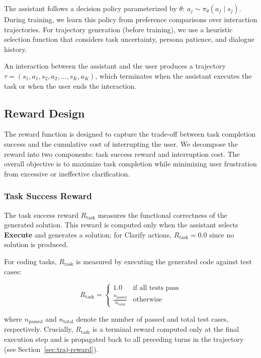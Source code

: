 The assistant follows a decision policy parameterized by $\theta$: $a_j \sim \pi_\theta(a_j \mid s_j)$. During training, we learn this policy from preference comparisons over interaction trajectories. For trajectory generation (before training), we use a heuristic selection function that considers task uncertainty, persona patience, and dialogue history.

An interaction between the assistant and the user produces a trajectory $\tau = (s_1, a_1, s_2, a_2, \dots, s_K, a_K)$, which terminates when the assistant executes the task or when the user ends the interaction.

\subsection{Reward Design}

The reward function is designed to capture the trade-off between task completion success and the cumulative cost of interrupting the user. We decompose the reward into two components: task success reward and interruption cost. The overall objective is to maximize task completion while minimizing user frustration from excessive or ineffective clarification.

\subsubsection{Task Success Reward}

The task success reward $R_{\text{task}}$ measures the functional correctness of the generated solution. This reward is computed only when the assistant selects \textbf{Execute} and generates a solution; for Clarify actions, $R_{\text{task}} = 0.0$ since no solution is produced.

For coding tasks, $R_{\text{task}}$ is measured by executing the generated code against test cases:

\begin{equation}
R_{\text{task}} = \begin{cases}
1.0 & \text{if all tests pass} \\
\frac{n_{\text{passed}}}{n_{\text{total}}} & \text{otherwise}
\end{cases}
\end{equation}

where $n_{\text{passed}}$ and $n_{\text{total}}$ denote the number of passed and total test cases, respectively. Crucially, $R_{\text{task}}$ is a terminal reward computed only at the final execution step and is propagated back to all preceding turns in the trajectory (see Section~\ref{sec:traj-reward}).

